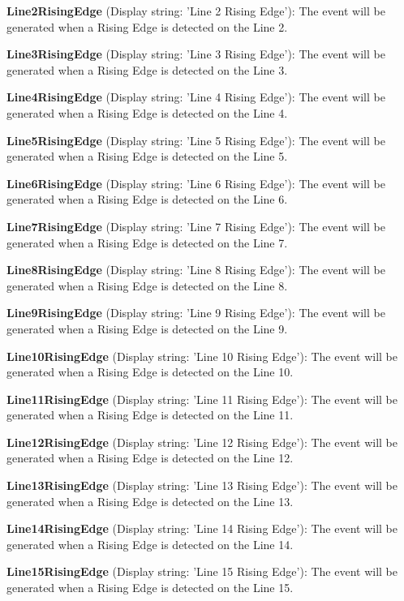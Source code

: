 \begin{DoxyItemize}
\item {\bfseries Line2\+Rising\+Edge} (Display string\+: 'Line 2 Rising Edge')\+: The event will be generated when a Rising Edge is detected on the Line 2.
\item {\bfseries Line3\+Rising\+Edge} (Display string\+: 'Line 3 Rising Edge')\+: The event will be generated when a Rising Edge is detected on the Line 3.
\item {\bfseries Line4\+Rising\+Edge} (Display string\+: 'Line 4 Rising Edge')\+: The event will be generated when a Rising Edge is detected on the Line 4.
\item {\bfseries Line5\+Rising\+Edge} (Display string\+: 'Line 5 Rising Edge')\+: The event will be generated when a Rising Edge is detected on the Line 5.
\item {\bfseries Line6\+Rising\+Edge} (Display string\+: 'Line 6 Rising Edge')\+: The event will be generated when a Rising Edge is detected on the Line 6.
\item {\bfseries Line7\+Rising\+Edge} (Display string\+: 'Line 7 Rising Edge')\+: The event will be generated when a Rising Edge is detected on the Line 7.
\item {\bfseries Line8\+Rising\+Edge} (Display string\+: 'Line 8 Rising Edge')\+: The event will be generated when a Rising Edge is detected on the Line 8.
\item {\bfseries Line9\+Rising\+Edge} (Display string\+: 'Line 9 Rising Edge')\+: The event will be generated when a Rising Edge is detected on the Line 9.
\item {\bfseries Line10\+Rising\+Edge} (Display string\+: 'Line 10 Rising Edge')\+: The event will be generated when a Rising Edge is detected on the Line 10.
\item {\bfseries Line11\+Rising\+Edge} (Display string\+: 'Line 11 Rising Edge')\+: The event will be generated when a Rising Edge is detected on the Line 11.
\item {\bfseries Line12\+Rising\+Edge} (Display string\+: 'Line 12 Rising Edge')\+: The event will be generated when a Rising Edge is detected on the Line 12.
\item {\bfseries Line13\+Rising\+Edge} (Display string\+: 'Line 13 Rising Edge')\+: The event will be generated when a Rising Edge is detected on the Line 13.
\item {\bfseries Line14\+Rising\+Edge} (Display string\+: 'Line 14 Rising Edge')\+: The event will be generated when a Rising Edge is detected on the Line 14.
\item {\bfseries Line15\+Rising\+Edge} (Display string\+: 'Line 15 Rising Edge')\+: The event will be generated when a Rising Edge is detected on the Line 15.

\end{DoxyItemize}
